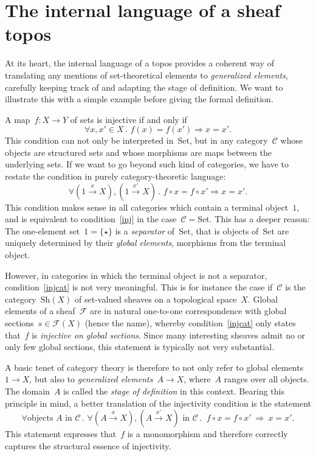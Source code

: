 \documentclass[10pt,reqno,a4paper]{amsbook}
\theoremstyle{definition}
\theoremstyle{plain}
\theoremstyle{remark}
\renewcommand{\C}{\mathcal{C}}
\newcommand{\F}{\mathcal{F}}
\newcommand{\Set}{\mathrm{Set}}
\newcommand{\Sh}{\mathrm{Sh}}
\newcommand{\?}{\,{:}\,}
\renewcommand{\_}{\mathpunct{.}\,}
\newcommand{\xra}{\xrightarrow}
\begin{document}
\section{The internal language of a sheaf topos}\label{sect:internal-language}

At its heart, the internal language of a topos provides a coherent way of
translating any mentions of set-theoretical elements to
\emph{generalized elements}, carefully keeping track of and adapting
the stage of definition. We want to illustrate this with a simple example
before giving the formal definition.

A map~$f : X \to Y$ of sets is injective if and only if
\begin{equation}\label{inj}
  \forall x,x' \in X\_ f(x) = f(x') \Longrightarrow x = x'.
\end{equation}
This condition can not only be interpreted in~$\Set$, but in any category~$\C$ whose
objects are structured sets and whose morphisms are maps between the underlying
sets. If we want to go beyond such kind of categories, we have to restate the
condition in purely category-theoretic language:
\begin{equation}\label{injcat}
  \forall (1 \xra{x} X), (1 \xra{x'} X)\_ f \circ x = f \circ x'
  \Longrightarrow x = x'.
\end{equation}
This condition makes sense in all categories which contain a terminal
object~$1$, and is equivalent to condition~\eqref{inj} in the case~$\C = \Set$.
This has a deeper reason: The one-element set~$1 = \{ \star \}$ is a
\emph{separator} of~$\Set$, that is objects of~$\Set$ are uniquely determined
by their \emph{global elements}, morphisms from the terminal object.

However, in categories in which the terminal object is not a separator,
condition~\eqref{injcat} is not very meaningful. This is for instance the case
if~$\C$ is the category~$\Sh(X)$ of set-valued sheaves on a topological
space~$X$. Global elements of a sheaf~$\F$ are in natural one-to-one
correspondence with global sections~$s \in \F(X)$ (hence the name), whereby
condition~\eqref{injcat} only states that~$f$ is \emph{injective on global
sections}. Since many interesting sheaves admit no or only few global sections,
this statement is typically not very substantial.

A basic tenet of category theory is therefore to not only refer to global
elements~$1 \to X$, but also to \emph{generalized elements}~$A \to X$,
where~$A$ ranges over all objects. The domain~$A$ is called the \emph{stage of
definition} in this context. Bearing this principle in mind, a better
translation of the injectivity condition is the statement
\begin{equation}\label{injgen}
  \forall \text{objects $A$ in~$\C$}\_ \forall (A \xra{x} X), (A \xra{x'\!} X) \text{ in~$\C$}\_\
  f \circ x = f \circ x' \ \Longrightarrow\ x = x'.
\end{equation}
This statement expresses that~$f$ is a monomorphism and therefore
correctly captures the structural essence of injectivity.
\end{document}
